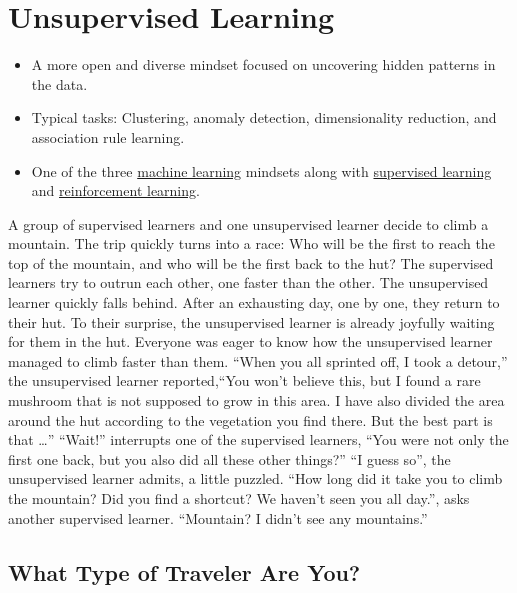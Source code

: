 \documentclass[
  10pt,
]{scrbook}
\providecommand{\tightlist}{%
  \setlength{\itemsep}{0pt}\setlength{\parskip}{0pt}}
\begin{document}
\hypertarget{unsupervised-ml}{%
\chapter{Unsupervised Learning}\label{unsupervised-ml}}

\begin{itemize}
\tightlist
\item
  A more open and diverse mindset focused on uncovering hidden patterns in the data.
\item
  Typical tasks: Clustering, anomaly detection, dimensionality reduction, and association rule learning.
\item
  One of the three \protect\hyperlink{machineux5cux2520learning}{machine learning} mindsets along with \protect\hyperlink{supervised-ml}{supervised learning} and \protect\hyperlink{reinforcement-learning}{reinforcement learning}.
\end{itemize}

A group of supervised learners and one unsupervised learner decide to climb a mountain.
The trip quickly turns into a race: Who will be the first to reach the top of the mountain, and who will be the first back to the hut?
The supervised learners try to outrun each other, one faster than the other.
The unsupervised learner quickly falls behind.
After an exhausting day, one by one, they return to their hut.
To their surprise, the unsupervised learner is already joyfully waiting for them in the hut.
Everyone was eager to know how the unsupervised learner managed to climb faster than them.
``When you all sprinted off, I took a detour,'' the unsupervised learner reported,``You won't believe this, but I found a rare mushroom that is not supposed to grow in this area. I have also divided the area around the hut according to the vegetation you find there. But the best part is that \ldots{}''
``Wait!'' interrupts one of the supervised learners, ``You were not only the first one back, but you also did all these other things?''
``I guess so'', the unsupervised learner admits, a little puzzled.
``How long did it take you to climb the mountain? Did you find a shortcut? We haven't seen you all day.'', asks another supervised learner.
``Mountain? I didn't see any mountains.''

\hypertarget{what-type-of-traveler-are-you}{%
\section{What Type of Traveler Are You?}\label{what-type-of-traveler-are-you}}
\end{document}
